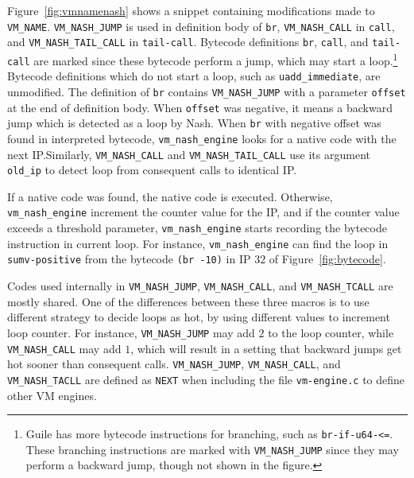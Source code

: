 \documentclass[preprint, 10pt]{sigplanconf}
\begin{document}
Figure~\hyperref[fig:vmnamenash]{\ref{fig:vmnamenash}} shows a snippet
containing modifications made to \texttt{VM\_NAME}. \texttt{VM\_NASH\_JUMP} is
used in definition body of \texttt{br}, \texttt{VM\_NASH\_CALL} in
\texttt{call}, and \texttt{VM\_NASH\_TAIL\_CALL} in
\texttt{tail-call}. Bytecode definitions \texttt{br}, \texttt{call}, and
\texttt{tail-call} are marked since these bytecode perform a jump, which may
start a loop.\footnote{Guile has more bytecode instructions for branching,
  such as \texttt{br-if-u64-<=}. These branching instructions are marked with
  \texttt{VM\_NASH\_JUMP} since they may perform a backward jump, though not
  shown in the figure.}  Bytecode definitions which do not start a loop, such
as \texttt{uadd\_immediate}, are unmodified. The definition of \texttt{br}
contains \texttt{VM\_NASH\_JUMP} with a parameter \texttt{offset} at the end
of definition body. When \texttt{offset} was negative, it means a backward
jump which is detected as a loop by Nash. When \texttt{br} with negative
offset was found in interpreted bytecode, \texttt{vm\_nash\_engine} looks for
a native code with the next IP.\@ Similarly, \texttt{VM\_NASH\_CALL} and
\texttt{VM\_NASH\_TAIL\_CALL} use its argument \texttt{old\_ip} to detect loop
from consequent calls to identical IP.\@




If a native code was found, the native code is executed. Otherwise,
\texttt{vm\_nash\_engine} increment the counter value for the IP, and if the
counter value exceeds a threshold parameter, \texttt{vm\_nash\_engine} starts
recording the bytecode instruction in current loop. For instance,
\texttt{vm\_nash\_engine} can find the loop in \texttt{sumv-positive} from the
bytecode \texttt{(br~-10)} in IP $32$ of
Figure~\hyperref[fig:bytecode]{\ref{fig:bytecode}}.

Codes used internally in \texttt{VM\_NASH\_JUMP}, \texttt{VM\_NASH\_CALL}, and
\texttt{VM\_NASH\_TCALL} are mostly shared. One of the differences between
these three macros is to use different strategy to decide loops as hot, by
using different values to increment loop counter. For instance,
\texttt{VM\_NASH\_JUMP} may add $2$ to the loop counter, while
\texttt{VM\_NASH\_CALL} may add $1$, which will result in a setting that
backward jumps get hot sooner than consequent calls.  \texttt{VM\_NASH\_JUMP},
\texttt{VM\_NASH\_CALL}, and \texttt{VM\_NASH\_TACLL} are defined as
\texttt{NEXT} when including the file \texttt{vm-engine.c} to define other VM
engines.
\end{document}
